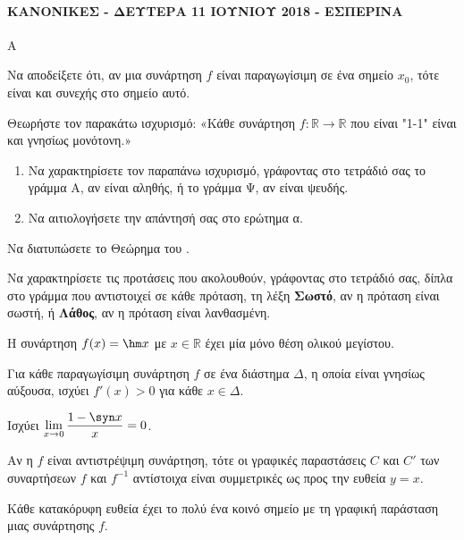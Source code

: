 \paragraph{ΚΑΝΟΝΙΚΕΣ - ΔΕΥΤΕΡΑ 11 ΙΟΥΝΙΟΥ 2018 - ΕΣΠΕΡΙΝΑ}
\begin{thema}{Α}
\begin{erwthma}
    \item Να αποδείξετε ότι, αν μια συνάρτηση $f$ είναι παραγωγίσιμη σε ένα σημείο $x_0$, τότε είναι και συνεχής στο σημείο αυτό. 
    \item Θεωρήστε τον παρακάτω ισχυρισμό: «Κάθε συνάρτηση $f : \mathbb{R} \to \mathbb{R}$ που είναι "1-1" είναι και γνησίως μονότονη.»
    \begin{enumerate}[label=\alph*.]
        \item Να χαρακτηρίσετε τον παραπάνω ισχυρισμό, γράφοντας στο τετράδιό σας το γράμμα Α, αν είναι αληθής, ή το γράμμα Ψ, αν είναι ψευδής. 
        \item Να αιτιολογήσετε την απάντησή σας στο ερώτημα α. 
    \end{enumerate}
    \item Να διατυπώσετε το Θεώρημα του . 
    \item Να χαρακτηρίσετε τις προτάσεις που ακολουθούν, γράφοντας στο τετράδιό σας, δίπλα στο γράμμα που αντιστοιχεί σε κάθε πρόταση, τη λέξη \textbf{Σωστό}, αν η πρόταση είναι σωστή, ή \textbf{Λάθος}, αν η πρόταση είναι λανθασμένη.
    \begin{alist}
        \item Η συνάρτηση $f(x) = \hm x$ με $x \in \mathbb{R}$ έχει μία μόνο θέση ολικού μεγίστου.
        \item Για κάθε παραγωγίσιμη συνάρτηση $f$ σε ένα διάστημα $\Delta$, η οποία είναι γνησίως αύξουσα, ισχύει $f'(x) > 0$ για κάθε $x \in \Delta$.
        \item Ισχύει $\displaystyle\lim_{x \to 0} \dfrac{1 - \syn x}{x} = 0$.
        \item Αν η $f$ είναι αντιστρέψιμη συνάρτηση, τότε οι γραφικές παραστάσεις $C$ και $C'$ των συναρτήσεων $f$ και $f^{-1}$ αντίστοιχα είναι συμμετρικές ως προς την ευθεία $y = x$.
        \item Κάθε κατακόρυφη ευθεία έχει το πολύ ένα κοινό σημείο με τη γραφική παράσταση μιας συνάρτησης $f$.
    \end{alist} 
\end{erwthma}
\end{thema}

